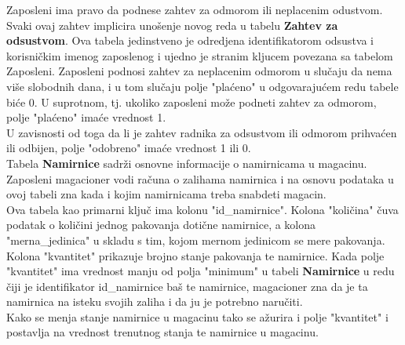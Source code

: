 Zaposleni ima pravo da podnese zahtev za odmorom ili neplacenim odustvom. Svaki ovaj zahtev implicira unošenje novog reda u tabelu \textbf{Zahtev za odsustvom}. Ova tabela jedinstveno je odredjena identifikatorom odsustva i korisničkim imenog zaposlenog i ujedno je stranim kljucem povezana sa tabelom Zaposleni. Zaposleni podnosi zahtev za neplacenim odmorom u slučaju da nema više slobodnih dana, i u tom slučaju polje "plaćeno" u odgovarajućem redu tabele biće 0. U suprotnom, tj. ukoliko zaposleni može podneti zahtev za odmorom, polje  "plaćeno" imaće vrednost 1. \\
U zavisnosti od toga da li je zahtev radnika za odsustvom ili odmorom prihvaćen ili odbijen, polje "odobreno" imaće vrednost 1 ili 0. \\

Tabela \textbf{Namirnice} sadrži osnovne informacije o namirnicama u magacinu. Zaposleni magacioner vodi računa o zalihama namirnica i na osnovu podataka u ovoj tabeli zna kada i kojim namirnicama treba snabdeti magacin. \\ 
Ova tabela kao primarni ključ ima kolonu "id\_namirnice". Kolona "količina" čuva podatak o količini  jednog pakovanja dotične namirnice, a kolona "merna\_jedinica"
u skladu s tim, kojom mernom jedinicom se mere pakovanja. Kolona "kvantitet" prikazuje brojno stanje pakovanja te namirnice.
Kada polje "kvantitet" ima vrednost manju od polja "minimum" u tabeli \textbf{Namirnice} u redu čiji je identifikator id\_namirnice baš te namirnice, magacioner zna da je ta namirnica na isteku svojih zaliha i da ju je potrebno naručiti. \\
Kako se menja stanje namirnice u magacinu tako se ažurira i polje "kvantitet" i postavlja na vrednost trenutnog stanja te namirnice u magacinu.

